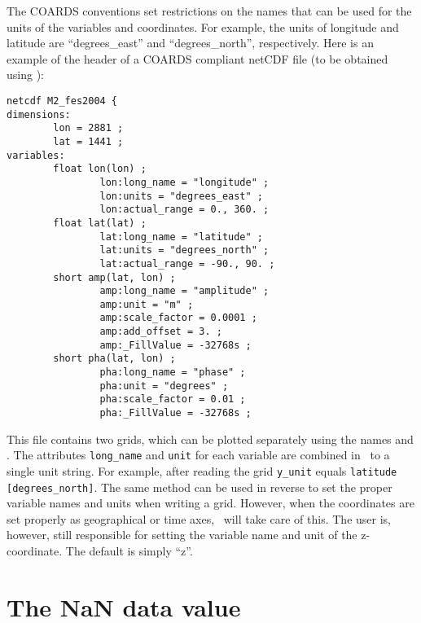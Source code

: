 The COARDS conventions set restrictions on the names that can be used for the units of the variables
and coordinates. For example, the units of longitude and latitude are ``degrees\_east'' and ``degrees\_north'',
respectively. Here is an example of the header of a COARDS compliant netCDF file (to be obtained using
):
\begin{verbatim}
netcdf M2_fes2004 {
dimensions:
        lon = 2881 ;
        lat = 1441 ;
variables:
        float lon(lon) ;
                lon:long_name = "longitude" ;
                lon:units = "degrees_east" ;
                lon:actual_range = 0., 360. ;
        float lat(lat) ;
                lat:long_name = "latitude" ;
                lat:units = "degrees_north" ;
                lat:actual_range = -90., 90. ;
        short amp(lat, lon) ;
                amp:long_name = "amplitude" ;
                amp:unit = "m" ;
                amp:scale_factor = 0.0001 ;
                amp:add_offset = 3. ;
                amp:_FillValue = -32768s ;
        short pha(lat, lon) ;
                pha:long_name = "phase" ;
                pha:unit = "degrees" ;
                pha:scale_factor = 0.01 ;
                pha:_FillValue = -32768s ;
\end{verbatim}
This file contains two grids, which can be plotted separately using the names 
and . The attributes \verb|long_name| and \verb|unit| for each variable are
combined in \GMT\ to a single unit string. For example, after reading the grid \verb|y_unit| equals
\verb|latitude [degrees_north]|. The same method can be used in reverse to set the proper variable names
and units when writing a grid. However, when the coordinates are set properly as geographical or time axes,
\GMT\ will take care of this. The user is, however, still responsible for setting the variable name and
unit of the z-coordinate. The default is simply ``z''.


\section{The NaN data value}

